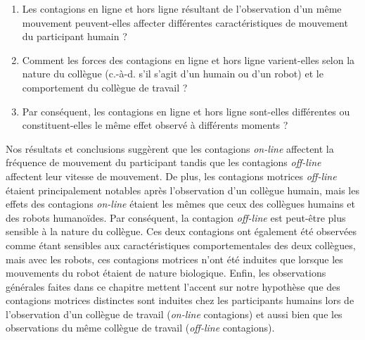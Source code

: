 \begin{enumerate}
	\item Les contagions en ligne et hors ligne résultant de l'observation d'un même mouvement peuvent-elles affecter différentes caractéristiques de mouvement du participant humain ?
	\item Comment les forces des contagions en ligne et hors ligne varient-elles selon la nature du collègue (c.-à-d. s'il s'agit d'un humain ou d'un robot) et le comportement du collègue de travail ?
	\item Par conséquent, les contagions en ligne et hors ligne sont-elles différentes ou constituent-elles le même effet observé à différents moments ?
\end{enumerate}




Nos résultats et conclusions suggèrent que les contagions \textit{on-line} affectent la fréquence de mouvement du participant tandis que les contagions \textit{off-line} affectent leur vitesse de mouvement. De plus, les contagions motrices \textit{off-line} étaient principalement notables après l'observation d'un collègue humain, mais les effets des contagions \textit{on-line} étaient les mêmes que ceux des collègues humains et des robots humanoïdes. Par conséquent, la contagion \textit{off-line} est peut-être plus sensible à la nature du collègue. Ces deux contagions ont également été observées comme étant sensibles aux caractéristiques comportementales des deux collègues, mais avec les robots, ces contagions motrices n'ont été induites que lorsque les mouvements du robot étaient de nature biologique.  Enfin, les observations générales faites dans ce chapitre mettent l'accent sur notre hypothèse que des contagions motrices distinctes sont induites chez les participants humains lors de l'observation d'un collègue de travail (\textit{on-line} contagions) et aussi bien que les observations du même collègue de travail (\textit{off-line} contagions).


